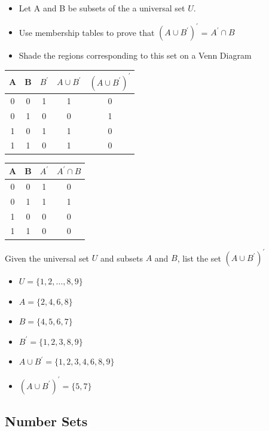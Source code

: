 \documentclass[]{report}
\begin{document}




\begin{itemize}
\item Let A and B be subsets of the a universal set $U$.
\item Use membership tables to prove that $(A \cup B^{\prime})^{\prime}$ = $A^{\prime} \cap B$
\item Shade the regions corresponding to this set on a Venn Diagram
\end{itemize}

\begin{tabular}{|c|c|| c | c| c|}
A&B&$B^{\prime}$&$A \cup B^{\prime}$&$(A \cup B^{\prime})^{\prime}$\\ \hline
0&0&1&1&0\\
0&1&0&0&1\\
1&0&1&1&0\\
1&1&0&1&0\\
\end{tabular}

\begin{tabular}{|c|c|| c | c| }
A&B&$A^{\prime}$&$A^{\prime} \cap B$\\\hline
0&0&1&0\\
0&1&1&1\\
1&0&0&0\\
1&1&0&0\\
\end{tabular}



Given the universal set $U$ and subsets $A$ and $B$, list the set $(A \cup B^{\prime})^{\prime}$
\begin{itemize}
\item $U=\{1,2,\ldots,8,9\}$
\item $A=\{2,4,6,8\}$
\item $B=\{ 4,5,6,7\}$
\item $B^{\prime}=\{ 1, 2, 3, 8, 9  \}$
\item $A \cup B^{\prime}=\{ 1, 2, 3,4, 6, 8, 9  \}$
\item $(A \cup B^{\prime})^{\prime}=\{ 5,7 \}$
\end{itemize}





\subsection{Number Sets}
\end{document}
